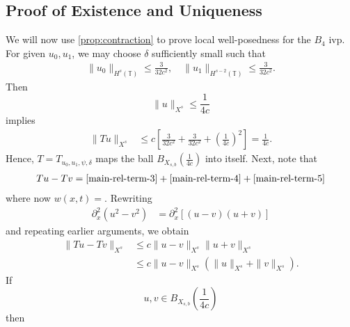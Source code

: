 \documentclass[12pt,reqno]{amsart}
\numberwithin{equation}{section}  %
\newcommand{\ci}{\mathbb{T}}
\newcommand{\p}{\partial}
\begin{document}
\subsection{Proof of Existence and Uniqueness}
\label{sec:proof-b4-per-case}
%
%
%
%				 
%
We will now use \cref{prop:contraction} to prove local well-posedness for the 
$B_4$ ivp. For given $u_0, u_1$, we may choose $\delta$ sufficiently small such
that 
%
\begin{equation*}
	\begin{split}
    \|u_0\|_{H^s(\ci)} \le \frac{3}{32c^2}, \quad \|u_1\|_{H^{s-2}(\ci)} \le \frac{3}{32c^2}.
	\end{split}
\end{equation*}
%
Then $$\|u\|_{X^{s}} \le \frac{1}{4c}$$ implies
%
\begin{equation*}
	\begin{split}
		\|Tu \|_{X^{s}} 
		& \le c \left[ \frac{3}{32c^2} + \frac{3}{32c^2}+ \left( 
		\frac{1}{4c} \right)^2 \right]
		=  \frac{1}{4c}.
	\end{split}
\end{equation*}
%
Hence, $T=T_{u_0, u_1, \psi, \delta}$ maps the ball $B_{X_{s,b}}(\frac{1}{4c} )$ into
itself. Next, note that 
%
\begin{equation*}
	\begin{split}
    Tu - Tv = \eqref{main-rel-term-3} + \eqref{main-rel-term-4} +
    \eqref{main-rel-term-5} 
  \end{split}
  \label{eqn:integral-form-dif}
\end{equation*}
%
where now $w(x,t) =$. Rewriting
%
\begin{equation*}
	\begin{split}
	\p_x^2 (u^2 - v^2)	
		& = \p_x^2[(u-v)(u+v)]
		\end{split}
\end{equation*}
%
and repeating earlier arguments, we obtain
%
\begin{equation}
	\label{20a}
	\begin{split}
		\|Tu - Tv \|_{X^{s}}  
		& \le c \|u -v\|_{X^{s}} \|u + v \|_{X^{s}}
		\\
		& \le c \|u -v\|_{X^{s}} (\|u\|_{X^{s}}+ \|v \|_{X^{s}}).
	\end{split}
\end{equation}
%
If $$ u, v \in B_{X_{s,b}} \left (\frac{1}{4c} \right )$$ then
\end{document}
